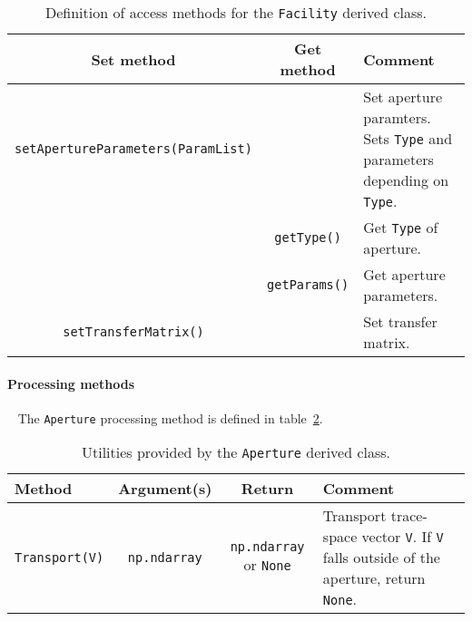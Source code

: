 \begin{table}[h]
  \caption{
    Definition of access methods for the \texttt{Facility} derived
    class. 
  }
  \label{Tab:Aprtr:Methods}
  \begin{center}
    \begin{tabular}{|c|c|p{7cm}|}
      \hline
      \textbf{Set method} & \textbf{Get method}  & \textbf{Comment}                                  \\
      \hline
      \texttt{setApertureParameters(ParamList)} &                      & Set aperture paramters.
                                                                         Sets \texttt{Type} and parameters
                                                                         depending on \texttt{Type}. \\
                                                & \texttt{getType()} & Get \texttt{Type} of aperture.\\
                                                & \texttt{getParams()} & Get aperture parameters.    \\
      \texttt{setTransferMatrix()}              &                      & Set transfer matrix.        \\
      \hline
    \end{tabular}
  \end{center}
\end{table}

\paragraph{Processing methods} ~\newline
\noindent
The \texttt{Aperture} processing method is defined in
table~\ref{Tab:Aprtr:Methods}.
\begin{table}[h]
  \caption{
    Utilities provided by the \texttt{Aperture} derived
    class. 
  }
  \label{Tab:Aprtr:Methods}
  \begin{center}
    \begin{tabular}{|l|c|c|p{7cm}|}
      \hline
      \textbf{Method} & \textbf{Argument(s)} & \textbf{Return} & \textbf{Comment}                                            \\
      \hline
      \texttt{Transport(V)} & \texttt{np.ndarray} & \texttt{np.ndarray} or \texttt{None} &
                        Transport trace-space vector \texttt{V}.  If \texttt{V} falls outside of the aperture, return \texttt{None}. \\
      \hline
    \end{tabular}
  \end{center}
\end{table}

